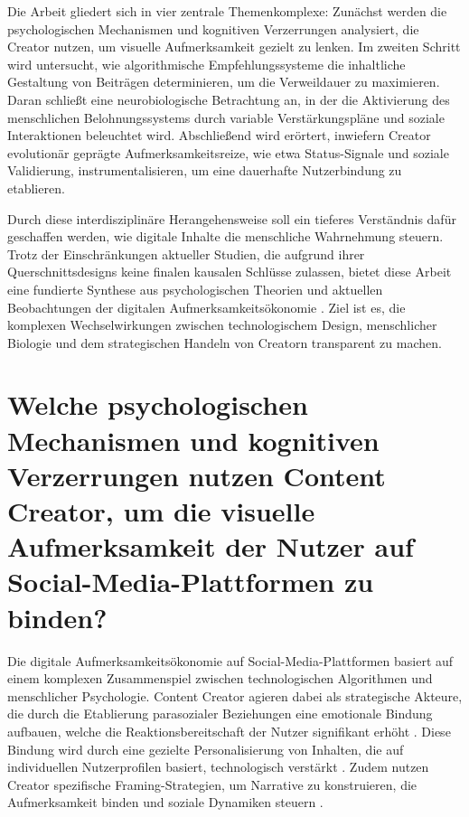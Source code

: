 \documentclass[11pt,a4paper]{article}
\begin{document}
Die Arbeit gliedert sich in vier zentrale Themenkomplexe: Zunächst werden die psychologischen Mechanismen und kognitiven Verzerrungen analysiert, die Creator nutzen, um visuelle Aufmerksamkeit gezielt zu lenken. Im zweiten Schritt wird untersucht, wie algorithmische Empfehlungssysteme die inhaltliche Gestaltung von Beiträgen determinieren, um die Verweildauer zu maximieren. Daran schließt eine neurobiologische Betrachtung an, in der die Aktivierung des menschlichen Belohnungssystems durch variable Verstärkungspläne und soziale Interaktionen beleuchtet wird. Abschließend wird erörtert, inwiefern Creator evolutionär geprägte Aufmerksamkeitsreize, wie etwa Status-Signale und soziale Validierung, instrumentalisieren, um eine dauerhafte Nutzerbindung zu etablieren.

Durch diese interdisziplinäre Herangehensweise soll ein tieferes Verständnis dafür geschaffen werden, wie digitale Inhalte die menschliche Wahrnehmung steuern. Trotz der Einschränkungen aktueller Studien, die aufgrund ihrer Querschnittsdesigns keine finalen kausalen Schlüsse zulassen, bietet diese Arbeit eine fundierte Synthese aus psychologischen Theorien und aktuellen Beobachtungen der digitalen Aufmerksamkeitsökonomie \autocite{openalex_W2924664363,crossref_10_55032_atskj_psychol_2020_1103}. Ziel ist es, die komplexen Wechselwirkungen zwischen technologischem Design, menschlicher Biologie und dem strategischen Handeln von Creatorn transparent zu machen.

\section{Welche psychologischen Mechanismen und kognitiven Verzerrungen nutzen Content Creator, um die visuelle Aufmerksamkeit der Nutzer auf Social-Media-Plattformen zu binden?}

Die digitale Aufmerksamkeitsökonomie auf Social-Media-Plattformen basiert auf einem komplexen Zusammenspiel zwischen technologischen Algorithmen und menschlicher Psychologie. Content Creator agieren dabei als strategische Akteure, die durch die Etablierung parasozialer Beziehungen eine emotionale Bindung aufbauen, welche die Reaktionsbereitschaft der Nutzer signifikant erhöht \autocite{grey_grey_5d5c282590c448fc8776b04f78a08de5}. Diese Bindung wird durch eine gezielte Personalisierung von Inhalten, die auf individuellen Nutzerprofilen basiert, technologisch verstärkt \autocite{crossref_10_22215_etd_2019_13484}. Zudem nutzen Creator spezifische Framing-Strategien, um Narrative zu konstruieren, die Aufmerksamkeit binden und soziale Dynamiken steuern \autocite{arxiv_2406_13820}.
\end{document}
